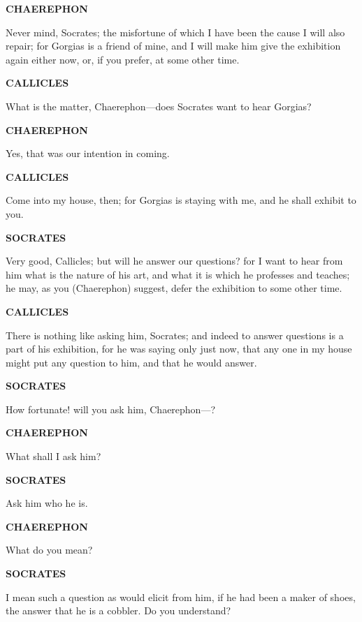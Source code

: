 \documentclass[11pt,letter]{article}
\begin{document}
\par \textbf{CHAEREPHON}
\par   Never mind, Socrates; the misfortune of which I have been the cause I will also repair; for Gorgias is a friend of mine, and I will make him give the exhibition again either now, or, if you prefer, at some other time.

\par \textbf{CALLICLES}
\par   What is the matter, Chaerephon—does Socrates want to hear Gorgias?

\par \textbf{CHAEREPHON}
\par   Yes, that was our intention in coming.

\par \textbf{CALLICLES}
\par   Come into my house, then; for Gorgias is staying with me, and he shall exhibit to you.

\par \textbf{SOCRATES}
\par   Very good, Callicles; but will he answer our questions? for I want to hear from him what is the nature of his art, and what it is which he professes and teaches; he may, as you (Chaerephon) suggest, defer the exhibition to some other time.

\par \textbf{CALLICLES}
\par   There is nothing like asking him, Socrates; and indeed to answer questions is a part of his exhibition, for he was saying only just now, that any one in my house might put any question to him, and that he would answer.

\par \textbf{SOCRATES}
\par   How fortunate! will you ask him, Chaerephon—?

\par \textbf{CHAEREPHON}
\par   What shall I ask him?

\par \textbf{SOCRATES}
\par   Ask him who he is.

\par \textbf{CHAEREPHON}
\par   What do you mean?

\par \textbf{SOCRATES}
\par   I mean such a question as would elicit from him, if he had been a maker of shoes, the answer that he is a cobbler. Do you understand?
\end{document}
